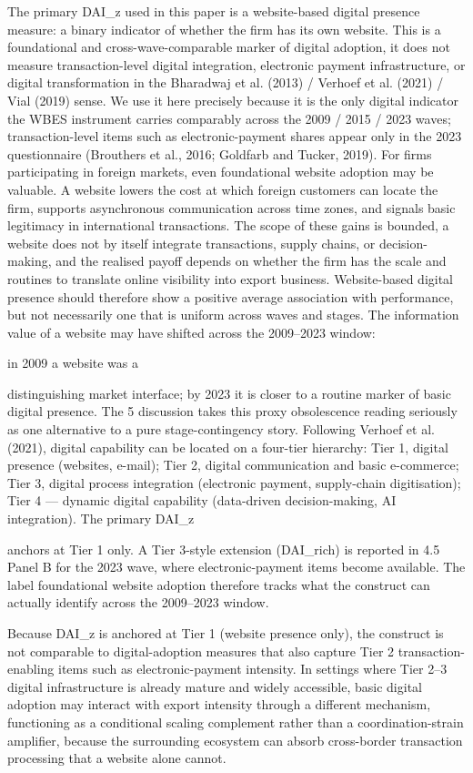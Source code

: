 \documentclass[12pt,a4paper]{article}
\begin{document}
The primary DAI\_z used in this paper is a website-based digital
presence measure: a binary indicator of whether the firm has its own
website. This is a foundational and cross-wave-comparable marker of
digital adoption, it does not measure transaction-level digital
integration, electronic payment infrastructure, or digital
transformation in the Bharadwaj et al. (2013) / Verhoef et al. (2021) /
Vial (2019) sense. We use it here precisely because it is the only
digital indicator the WBES instrument carries comparably across the 2009
/ 2015 / 2023 waves; transaction-level items such as electronic-payment
shares appear only in the 2023 questionnaire (Brouthers et al., 2016;
Goldfarb and Tucker, 2019). For firms participating in foreign markets,
even foundational website adoption may be valuable. A website lowers the
cost at which foreign customers can locate the firm, supports
asynchronous communication across time zones, and signals basic
legitimacy in international transactions. The scope of these gains is
bounded, a website does not by itself integrate transactions, supply
chains, or decision-making, and the realised payoff depends on whether
the firm has the scale and routines to translate online visibility into
export business. Website-based digital presence should therefore show a
positive average association with performance, but not necessarily one
that is uniform across waves and stages. The information value of a
website may have shifted across the 2009--2023 window:

in 2009 a website was a

distinguishing market interface; by 2023 it is closer to a routine
marker of basic digital presence. The 5 discussion takes this proxy
obsolescence reading seriously as one alternative to a pure
stage-contingency story. Following Verhoef et al. (2021), digital
capability can be located on a four-tier hierarchy: Tier 1, digital
presence (websites, e-mail); Tier 2, digital communication and basic
e-commerce; Tier 3, digital process integration (electronic payment,
supply-chain digitisation); Tier 4 --- dynamic digital capability
(data-driven decision-making, AI integration). The primary DAI\_z

anchors at Tier 1 only. A Tier 3-style extension (DAI\_rich) is reported
in 4.5 Panel B for the 2023 wave, where electronic-payment items become
available. The label foundational website adoption therefore tracks what
the construct can actually identify across the 2009--2023 window.

Because DAI\_z is anchored at Tier 1 (website presence only), the
construct is not comparable to digital-adoption measures that also
capture Tier 2 transaction-enabling items such as electronic-payment
intensity. In settings where Tier 2--3 digital infrastructure is already
mature and widely accessible, basic digital adoption may interact with
export intensity through a different mechanism, functioning as a
conditional scaling complement rather than a coordination-strain
amplifier, because the surrounding ecosystem can absorb cross-border
transaction processing that a website alone cannot.
\end{document}
